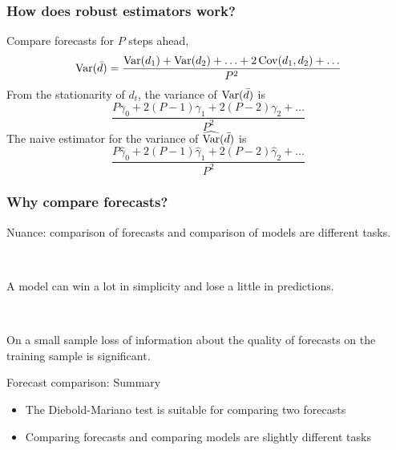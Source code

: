 \begin{frame}
	\frametitle{How does robust estimators work?}
	
	Compare forecasts for $P$ steps ahead,
	\[
	\operatorname{Var}(\bar d) = \frac{\operatorname{Var}(d_1) + \operatorname{Var}(d_2) + \ldots + 2\operatorname{Cov}(d_1, d_2) + \ldots}{P^2}
	\]\pause
	From the stationarity of $d_t$, the variance of $\operatorname{Var}(\bar d)$ is
	\[
	\frac{P\gamma_0 + 2(P-1) \gamma_1 + 2(P-2)\gamma_2 +\ldots}{P^2}
	\]\pause
	The naive estimator for the variance of $\widehat{\operatorname{Var}}(\bar d)$ is
	\[
	\frac{ P\hat\gamma_0 + 2(P-1) \hat\gamma_1 + 2(P-2)\hat\gamma_2 +\ldots}{P^2}
	\]
\end{frame}



\begin{frame}
	\frametitle{Why compare forecasts?}
	
	\alert{Nuance}: comparison of forecasts and comparison of models are different tasks.
	\pause
	
	\
	
	A model can win a lot \alert{in simplicity} and lose a little in predictions.
	\pause
	
	\
	
	On a small sample \alert{loss of information} about the quality of forecasts on the training sample is significant.
	\pause
	

\end{frame}


\begin{frame}{Forecast comparison: Summary}
	
	\begin{itemize}[<+->]
		\item The Diebold-Mariano test is suitable for comparing \alert{two} forecasts
		\item Comparing forecasts and comparing models are \alert{slightly different} tasks
	\end{itemize}
\end{frame}